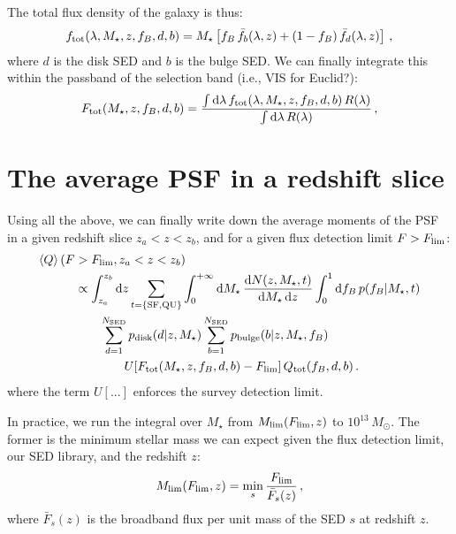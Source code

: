 \documentclass[11pt,a4paper]{article}
\newcommand\mean[1]{\left< #1 \right>}
\newcommand{\msun}{M_\odot}
\newcommand{\mstar}{M_\star}
\newcommand{\dd}{\mathrm{d}}
\numberwithin{equation}{section}
\begin{document}
The total flux density of the galaxy is thus:
\begin{align}
f_{\rm tot}(\lambda, \mstar, z, f_B, d, b) = \mstar\left[f_B\,\bar{f}_b(\lambda, z) + (1-f_B)\,\bar{f}_d(\lambda, z)\right]\,,
\end{align}
where $d$ is the disk SED and $b$ is the bulge SED. We can finally integrate this within the passband of the selection band (i.e., VIS for Euclid?):
\begin{align}
F_{\rm tot}(\mstar, z, f_B, d, b) = \frac{\int \dd\lambda\,f_{\rm tot}(\lambda, \mstar, z, f_B, d, b)\,R(\lambda)}{\int \dd\lambda\,R(\lambda)}\,,
\end{align}

\section{The average PSF in a redshift slice}

Using all the above, we can finally write down the average moments of the PSF in a given redshift slice $z_a < z < z_b$, and for a given flux detection limit $F > F_{\rm lim}$:
\begin{align}
\mean{Q}(F &> F_{\rm lim}, z_a < z < z_b) \nonumber \\
&\propto \int_{z_a}^{z_b}\dd z\sum_{t=\{{\rm SF,QU}\}}\int_0^{+\infty} \dd \mstar\,\frac{\dd N(z, \mstar, t)}{\dd \mstar\, \dd z} \int_0^1\dd f_B\,p(f_B | \mstar,t) \nonumber \\
&\quad\quad \sum_{d=1}^{N_{\rm SED}} p_{\rm disk}(d | z,\mstar) \sum_{b=1}^{N_{\rm SED}}p_{\rm bulge}(b | z,\mstar,f_B) \nonumber \\
&\quad\quad\quad\quad U[F_{\rm tot}(\mstar, z, f_B, d, b) - F_{\rm lim}]\,Q_{\rm tot}(f_B, d, b)\,.
\end{align}
where the term $U[...]$ enforces the survey detection limit.

In practice, we run the integral over $\mstar$ from $M_{\rm lim}(F_{\rm lim},z)$ to $10^{13}\,\msun$. The former is the minimum stellar mass we can expect given the flux detection limit, our SED library, and the redshift $z$:
\begin{align}
M_{\rm lim}(F_{\rm lim},z) = \min_{s} \frac{F_{\rm lim}}{\bar{F}_s(z)}\,,
\end{align}
where $\bar{F}_s(z)$ is the broadband flux per unit mass of the SED $s$ at redshift $z$.
\end{document}
